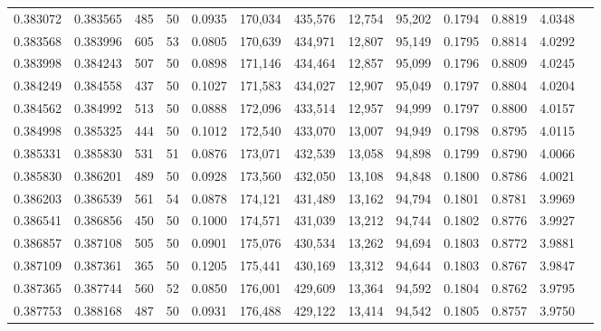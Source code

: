 \begin{tabular}{rrrrrrrrrrrrr}
0.383072 & 0.383565 &   485 &  50 &                                     0.0935 & 170,034 & 435,576 &  12,754 &  95,202 & 0.1794 & 0.8819 & 4.0348 \\
0.383568 & 0.383996 &   605 &  53 &                                     0.0805 & 170,639 & 434,971 &  12,807 &  95,149 & 0.1795 & 0.8814 & 4.0292 \\
0.383998 & 0.384243 &   507 &  50 &                                     0.0898 & 171,146 & 434,464 &  12,857 &  95,099 & 0.1796 & 0.8809 & 4.0245 \\
0.384249 & 0.384558 &   437 &  50 &                                     0.1027 & 171,583 & 434,027 &  12,907 &  95,049 & 0.1797 & 0.8804 & 4.0204 \\
0.384562 & 0.384992 &   513 &  50 &                                     0.0888 & 172,096 & 433,514 &  12,957 &  94,999 & 0.1797 & 0.8800 & 4.0157 \\
0.384998 & 0.385325 &   444 &  50 &                                     0.1012 & 172,540 & 433,070 &  13,007 &  94,949 & 0.1798 & 0.8795 & 4.0115 \\
0.385331 & 0.385830 &   531 &  51 &                                     0.0876 & 173,071 & 432,539 &  13,058 &  94,898 & 0.1799 & 0.8790 & 4.0066 \\
0.385830 & 0.386201 &   489 &  50 &                                     0.0928 & 173,560 & 432,050 &  13,108 &  94,848 & 0.1800 & 0.8786 & 4.0021 \\
0.386203 & 0.386539 &   561 &  54 &                                     0.0878 & 174,121 & 431,489 &  13,162 &  94,794 & 0.1801 & 0.8781 & 3.9969 \\
0.386541 & 0.386856 &   450 &  50 &                                     0.1000 & 174,571 & 431,039 &  13,212 &  94,744 & 0.1802 & 0.8776 & 3.9927 \\
0.386857 & 0.387108 &   505 &  50 &                                     0.0901 & 175,076 & 430,534 &  13,262 &  94,694 & 0.1803 & 0.8772 & 3.9881 \\
0.387109 & 0.387361 &   365 &  50 &                                     0.1205 & 175,441 & 430,169 &  13,312 &  94,644 & 0.1803 & 0.8767 & 3.9847 \\
0.387365 & 0.387744 &   560 &  52 &                                     0.0850 & 176,001 & 429,609 &  13,364 &  94,592 & 0.1804 & 0.8762 & 3.9795 \\
0.387753 & 0.388168 &   487 &  50 &                                     0.0931 & 176,488 & 429,122 &  13,414 &  94,542 & 0.1805 & 0.8757 & 3.9750 \\

\end{tabular}
